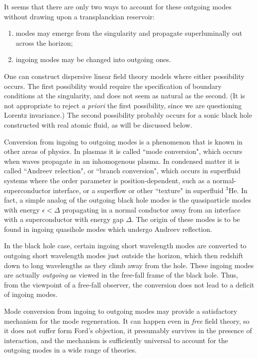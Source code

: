 It seems that there are only two ways to account for these outgoing
modes without drawing upon a transplanckian reservoir:
\begin{enumerate} 
\item modes may emerge from the singularity and
propagate superluminally out across the horizon; 
\item ingoing modes
may be changed into outgoing ones.  
\end{enumerate} 
One can construct
dispersive linear field theory
models\cite{Unruh2,BMPS,Jaco-mex,CorlJaco} where either possibility
occurs. The first possibility would require the specification of
boundary conditions at the singularity, and does not seem as natural
as the second.  (It is not appropriate to reject  {\it a priori} the
first possibility, since we are questioning Lorentz invariance.) The
second possibility probably occurs for a sonic black hole\cite{Unruh1}
constructed with real atomic fluid, as will be discussed below.

Conversion from ingoing to outgoing modes is a phenomenon that is known
in other areas of physics. In plasmas it is called ``mode conversion",
which occurs when waves propagate in an inhomogenous
plasma\cite{Stix,Swanson}. In condensed matter it is called ``Andreev
relection", or ``branch conversion", which occurs in superfluid systems
where the order parameter is position-dependent, such as a
normal-superconductor interface\cite{Andr}, or a superflow or other
``texture" in superfluid $^3$He\cite{GreaLegg}.  In fact, a simple
analog of the outgoing black hole modes is the quasiparticle modes with
energy $\epsilon<\Delta$ propagating in a normal conductor away from an
interface with a superconductor with energy gap $\Delta$. The origin of
these modes is to be found in ingoing quasihole modes which undergo
Andreev reflection.

In the black hole case, certain ingoing short wavelength modes are
converted to outgoing short wavelength modes just outside the horizon,
which then redshift down to long wavelengths as they climb away from
the hole.  These ingoing modes are actually {\it outgoing} as viewed in
the free-fall frame of the black hole. Thus, from the viewpoint of a
free-fall observer, the conversion does not lead to a deficit of
ingoing modes.

Mode conversion from ingoing to outgoing modes may provide a
satisfactory mechanism for the mode regeneration. It can happen even in
{\it free} field theory, so it does not suffer form Ford's objection,
it presumably survives in the presence of interaction, and the
mechanism is sufficiently universal to account for the outgoing modes
in a wide range of theories.


